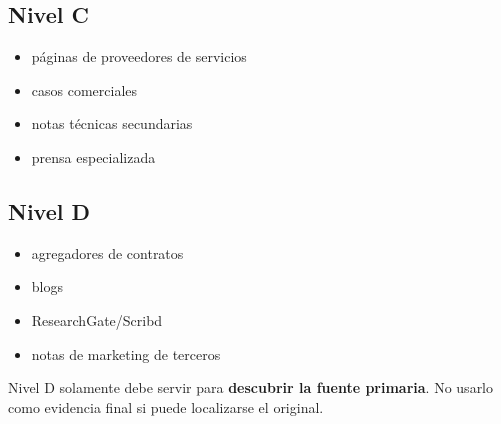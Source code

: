 \documentclass[11pt,a4paper]{article}
\begin{document}
\subsection*{Nivel C}
\begin{itemize}
\item páginas de proveedores de servicios
\item casos comerciales
\item notas técnicas secundarias
\item prensa especializada
\end{itemize}


\subsection*{Nivel D}
\begin{itemize}
\item agregadores de contratos
\item blogs
\item ResearchGate/Scribd
\item notas de marketing de terceros
\end{itemize}

Nivel D solamente debe servir para \textbf{descubrir la fuente primaria}. No usarlo como evidencia final si puede localizarse el original.
\end{document}
